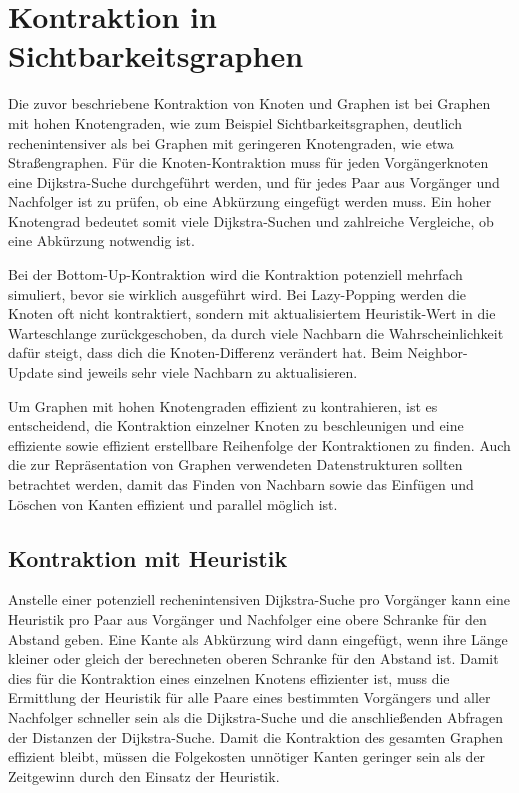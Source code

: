 \chapter{Kontraktion in Sichtbarkeitsgraphen}\label{chapter:kontraktion}

Die zuvor beschriebene Kontraktion von Knoten und Graphen ist bei Graphen mit hohen Knotengraden, wie zum Beispiel Sichtbarkeitsgraphen, deutlich rechenintensiver als bei Graphen mit geringeren Knotengraden, wie etwa Straßengraphen.
Für die Knoten-Kontraktion muss für jeden Vorgängerknoten eine Dijkstra-Suche durchgeführt werden, und für jedes Paar aus Vorgänger und Nachfolger ist zu prüfen, ob eine Abkürzung eingefügt werden muss.
Ein hoher Knotengrad bedeutet somit viele Dijkstra-Suchen und zahlreiche Vergleiche, ob eine Abkürzung notwendig ist.

Bei der Bottom-Up-Kontraktion wird die Kontraktion potenziell mehrfach simuliert, bevor sie wirklich ausgeführt wird.
Bei Lazy-Popping werden die Knoten oft nicht kontraktiert, sondern mit aktualisiertem Heuristik-Wert in die Warteschlange zurückgeschoben, da durch viele Nachbarn die Wahrscheinlichkeit dafür steigt, dass dich die Knoten-Differenz verändert hat.
Beim Neighbor-Update sind jeweils sehr viele Nachbarn zu aktualisieren.

Um Graphen mit hohen Knotengraden effizient zu kontrahieren, ist es entscheidend, die Kontraktion einzelner Knoten zu beschleunigen und eine effiziente sowie effizient erstellbare Reihenfolge der Kontraktionen zu finden.
Auch die zur Repräsentation von Graphen verwendeten Datenstrukturen sollten betrachtet werden, damit das Finden von Nachbarn sowie das Einfügen und Löschen von Kanten effizient und parallel möglich ist.

\section{Kontraktion mit Heuristik}

Anstelle einer potenziell rechenintensiven Dijkstra-Suche pro Vorgänger kann eine Heuristik pro Paar aus Vorgänger und Nachfolger eine obere Schranke für den Abstand geben.
Eine Kante als Abkürzung wird dann eingefügt, wenn ihre Länge kleiner oder gleich der berechneten oberen Schranke für den Abstand ist.
Damit dies für die Kontraktion eines einzelnen Knotens effizienter ist, muss die Ermittlung der Heuristik für alle Paare eines bestimmten Vorgängers und aller Nachfolger schneller sein als die Dijkstra-Suche und die anschließenden Abfragen der Distanzen der Dijkstra-Suche.
Damit die Kontraktion des gesamten Graphen effizient bleibt, müssen die Folgekosten unnötiger Kanten geringer sein als der Zeitgewinn durch den Einsatz der Heuristik.

